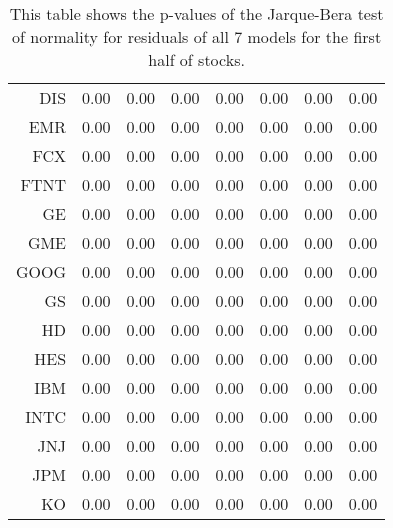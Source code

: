 \begin{table}[ht]
\begin{tabular}{rrrrrrrr}
  DIS & 0.00 & 0.00 & 0.00 & 0.00 & 0.00 & 0.00 & 0.00 \\ 
  EMR & 0.00 & 0.00 & 0.00 & 0.00 & 0.00 & 0.00 & 0.00 \\ 
  FCX & 0.00 & 0.00 & 0.00 & 0.00 & 0.00 & 0.00 & 0.00 \\ 
  FTNT & 0.00 & 0.00 & 0.00 & 0.00 & 0.00 & 0.00 & 0.00 \\ 
  GE & 0.00 & 0.00 & 0.00 & 0.00 & 0.00 & 0.00 & 0.00 \\ 
  GME & 0.00 & 0.00 & 0.00 & 0.00 & 0.00 & 0.00 & 0.00 \\ 
  GOOG & 0.00 & 0.00 & 0.00 & 0.00 & 0.00 & 0.00 & 0.00 \\ 
  GS & 0.00 & 0.00 & 0.00 & 0.00 & 0.00 & 0.00 & 0.00 \\ 
  HD & 0.00 & 0.00 & 0.00 & 0.00 & 0.00 & 0.00 & 0.00 \\ 
  HES & 0.00 & 0.00 & 0.00 & 0.00 & 0.00 & 0.00 & 0.00 \\ 
  IBM & 0.00 & 0.00 & 0.00 & 0.00 & 0.00 & 0.00 & 0.00 \\ 
  INTC & 0.00 & 0.00 & 0.00 & 0.00 & 0.00 & 0.00 & 0.00 \\ 
  JNJ & 0.00 & 0.00 & 0.00 & 0.00 & 0.00 & 0.00 & 0.00 \\ 
  JPM & 0.00 & 0.00 & 0.00 & 0.00 & 0.00 & 0.00 & 0.00 \\ 
  KO & 0.00 & 0.00 & 0.00 & 0.00 & 0.00 & 0.00 & 0.00 \\ 
   \hline
\end{tabular}
\caption[p-values of Jarque-Bera test on model residuals (1)]{This table shows the p-values of the Jarque-Bera test of normality for residuals 
              of all 7 models for the first half of stocks.} 
\label{Table:JBresid_p_vals_1}
\end{table}
